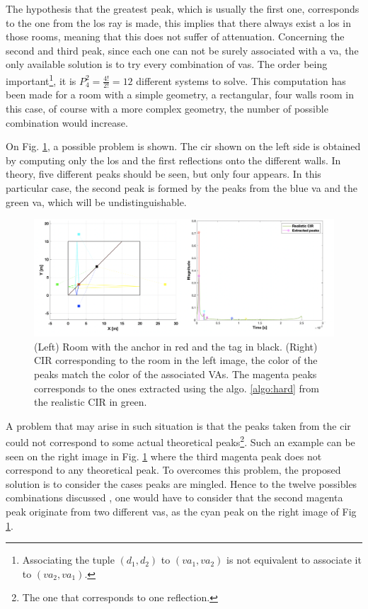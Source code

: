 The hypothesis that the greatest peak, which is usually the first one, corresponds to the one from the \gls{los} ray is made, this implies that there always exist a \gls{los} in those rooms, meaning that this does not suffer of attenuation. Concerning the second and third peak, since each one can not be surely associated with a \gls{va}, the only available solution is to try every combination of \glspl{va}. The order being important\footnote{Associating the tuple $(d_1, d_2)$ to $(va_1, va_2)$ is not equivalent to associate it to $(va_2, va_1)$.}, it is $P^2_4 = \frac{4!}{2!} = 12$ different systems to solve. This computation has been made for a room with a simple geometry, a rectangular, four walls room in this case, of course with a more complex geometry, the number of possible combination would increase.
\vspace{2mm}

On Fig. \ref{fig:va_sym}, a possible problem is shown. The \gls{cir} shown on the left side is obtained by computing only the \gls{los} and the first reflections onto the different walls. In theory, five different peaks should be seen, but only four appears. In this particular case, the second peak is formed by the peaks from the blue \gls{va} and the green \gls{va}, which will be undistinguishable.

\begin{figure}[H]
\centering
\includegraphics[width=\linewidth]{Images/antenna_combined.png}
\caption{(Left) Room with the anchor in red and the tag in black. (Right) CIR corresponding to the room in the left image, the color of the peaks match the color of the associated VAs. The magenta peaks corresponds to the ones extracted using the algo. \ref{algo:hard} from the realistic CIR in green. \label{fig:va_sym}}
\end{figure}

A problem that may arise in such situation is that the peaks taken from the \gls{cir} could not correspond to some actual theoretical peaks\footnote{The one that corresponds to one reflection. }. Such an example can be seen on the right image in  Fig. \ref{fig:va_sym} where the third magenta peak does not correspond to any theoretical peak. To overcomes this problem, the proposed solution is to consider the cases peaks are mingled. Hence to the twelve possibles combinations discussed , one would have to consider that the second magenta peak originate from two different \glspl{va}, as the cyan peak on the right image of Fig \ref{fig:va_sym}.
\vspace{2mm}

